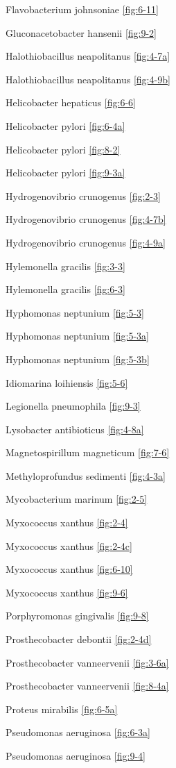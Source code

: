 \documentclass[]{tufte-book}
\begin{document}
Flavobacterium johnsoniae \ref{fig:6-11}

Gluconacetobacter hansenii \ref{fig:9-2}

Halothiobacillus neapolitanus \ref{fig:4-7a}

Halothiobacillus neapolitanus \ref{fig:4-9b}

Helicobacter hepaticus \ref{fig:6-6}

Helicobacter pylori \ref{fig:6-4a}

Helicobacter pylori \ref{fig:8-2}

Helicobacter pylori \ref{fig:9-3a}

Hydrogenovibrio crunogenus \ref{fig:2-3}

Hydrogenovibrio crunogenus \ref{fig:4-7b}

Hydrogenovibrio crunogenus \ref{fig:4-9a}

Hylemonella gracilis \ref{fig:3-3}

Hylemonella gracilis \ref{fig:6-3}

Hyphomonas neptunium \ref{fig:5-3}

Hyphomonas neptunium \ref{fig:5-3a}

Hyphomonas neptunium \ref{fig:5-3b}

Idiomarina loihiensis \ref{fig:5-6}

Legionella pneumophila \ref{fig:9-3}

Lysobacter antibioticus \ref{fig:4-8a}

Magnetospirillum magneticum \ref{fig:7-6}

Methyloprofundus sedimenti \ref{fig:4-3a}

Mycobacterium marinum \ref{fig:2-5}

Myxococcus xanthus \ref{fig:2-4}

Myxococcus xanthus \ref{fig:2-4c}

Myxococcus xanthus \ref{fig:6-10}

Myxococcus xanthus \ref{fig:9-6}

Porphyromonas gingivalis \ref{fig:9-8}

Prosthecobacter debontii \ref{fig:2-4d}

Prosthecobacter vanneervenii \ref{fig:3-6a}

Prosthecobacter vanneervenii \ref{fig:8-4a}

Proteus mirabilis \ref{fig:6-5a}

Pseudomonas aeruginosa \ref{fig:6-3a}

Pseudomonas aeruginosa \ref{fig:9-4}
\end{document}

